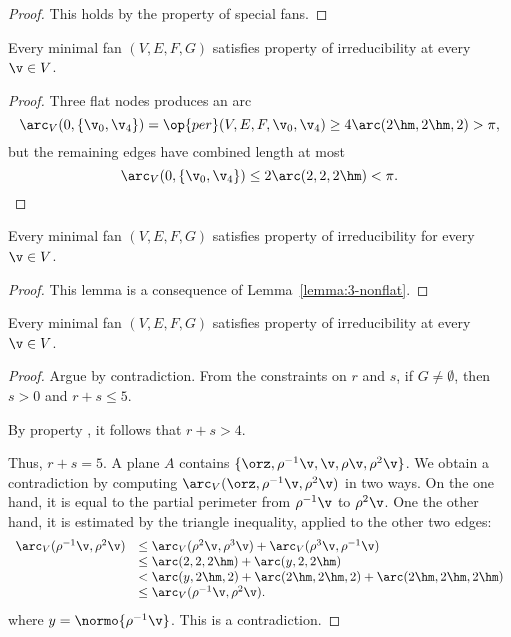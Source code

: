 \begin{proof} This holds by the property  of special fans.
\end{proof}


\begin{lemma}
Every minimal fan $(V,E,F,G)$ satisfies property  of irreducibility at every $\v\in V$.
\end{lemma}

\begin{proof}  Three flat nodes produces an arc
\begin{displaymath}
  \arc_V(0,\{\v_0,\v_4\}) 
= \op{per}(V,E,F,\v_0,\v_4) \ge4\arc(2\hm,2\hm,2) > \pi,
\end{displaymath}
but the remaining edges  have combined length at most
\begin{displaymath}
\arc_V(0,\{\v_0,\v_4\})\le 2\arc(2,2,2\hm) < \pi.
\end{displaymath}
\end{proof}

\begin{lemma}
Every minimal fan $(V,E,F,G)$ satisfies property 
of irreducibility for every $\v\in V$.
\end{lemma}

\begin{proof}  
This lemma is a consequence of Lemma~\ref{lemma:3-nonflat}.
\end{proof}



\begin{lemma}
Every minimal fan $(V,E,F,G)$ satisfies property  of
irreducibility at every $\v\in V$.
\end{lemma}

\begin{proof} Argue by contradiction.  From the constraints on $r$ and
$s$, if $G\ne\emptyset$, then $s>0$ and $r+s\le 5$.

By property , it follows that $r+s> 4$.

Thus, $r+s=5$.  A plane $A$ contains
$\{\orz,\rho^{-1}\v,\v,\rho\v,\rho^2\v\}$.  We obtain a contradiction
by computing $\arc_V(\orz,\rho^{-1}\v,\rho^2\v)$ in two ways.  On the
one hand, it is equal to the partial perimeter from $\rho^{-1}\v$ to
$\rho^2 \v$.  One the other hand, it is estimated by the triangle
inequality, applied to the other two edges:
\begin{displaymath}
\begin{array}{lll}
\arc_V(\rho^{-1}\v,\rho^2\v)
&\le\arc_V(\rho^2\v,\rho^3\v) + \arc_V(\rho^3\v,\rho^{-1}\v) \\
&\le\arc(2,2,2\hm)+\arc(y,2,2\hm)\\
&<\arc(y,2\hm,2)+\arc(2\hm,2\hm,2) +\arc(2\hm,2\hm,2\hm)\\
&\le\arc_V(\rho^{-1}\v,\rho^2\v).
\end{array}
\end{displaymath}
where $y=\normo{\rho^{-1} \v}$.
This is a contradiction.
\end{proof}

